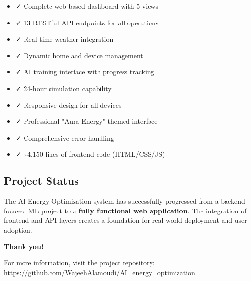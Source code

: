 \documentclass[12pt,a4paper]{article}
\begin{document}
\begin{tcolorbox}[colback=secondarycolor!5, colframe=secondarycolor, title=Checkpoint 2 Deliverables]
\begin{itemize}[leftmargin=*]
    \item ✓ Complete web-based dashboard with 5 views
    \item ✓ 13 RESTful API endpoints for all operations
    \item ✓ Real-time weather integration
    \item ✓ Dynamic home and device management
    \item ✓ AI training interface with progress tracking
    \item ✓ 24-hour simulation capability
    \item ✓ Responsive design for all devices
    \item ✓ Professional "Aura Energy" themed interface
    \item ✓ Comprehensive error handling
    \item ✓ \textasciitilde 4,150 lines of frontend code (HTML/CSS/JS)
\end{itemize}
\end{tcolorbox}

\subsection{Project Status}

The AI Energy Optimization system has successfully progressed from a backend-focused ML project to a \textbf{fully functional web application}. The integration of frontend and API layers creates a foundation for real-world deployment and user adoption.

\vspace{1cm}

\begin{center}
\textbf{\Large Thank you!}

\vspace{0.5cm}

For more information, visit the project repository:\\
\url{https://github.com/WajeehAlamoudi/AI_energy_optimization}
\end{center}


\newpage
\appendix
\end{document}
